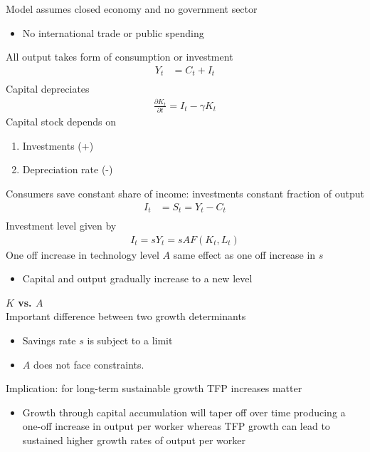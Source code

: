 \documentclass{beamer}
\begin{document}
\begin{frame}
  Model assumes closed economy and no government sector
  \begin{itemize}
    \item No international trade or public spending
  \end{itemize}
  \medskip
  All output takes form of consumption or investment
  \begin{align}
       Y_t &= C_t+I_t\\       
  \end{align}
  \medskip
  Capital depreciates
\begin{align}
  \frac{\partial K_t}{\partial t}=I_t -\gamma K_t
\end{align}
Capital stock depends on 
\begin{enumerate}
  \item Investments (+)
  \item Depreciation rate (-)
\end{enumerate}
\end{frame}

\begin{frame}
  Consumers save constant share of income: investments constant fraction of output
\begin{align}
  I_t &= S_t = Y_t-C_t\\      
\end{align}
 \medskip
Investment level given by
\begin{align}
  I_t=sY_t=sAF(K_t,L_t)
\end{align}
One off increase in technology level $A$ same effect as one off increase in $s$ 
 \begin{itemize}
   \item Capital and output gradually increase to a new level
 \end{itemize}
\end{frame}

\begin{frame}
  \textbf{$K$ vs. $A$}\\
  Important difference between two growth determinants 
  \begin{itemize}
    \item Savings rate $s$ is subject to a limit
    \item $A$ does not face constraints. 
  \end{itemize}
  \medskip
  Implication: for long-term sustainable growth TFP increases matter
  \begin{itemize}
    \item Growth through capital accumulation will taper off over time producing a one-off increase in output per worker whereas TFP growth can lead to sustained higher growth rates of output per worker
  \end{itemize}
\end{frame}
\end{document}
